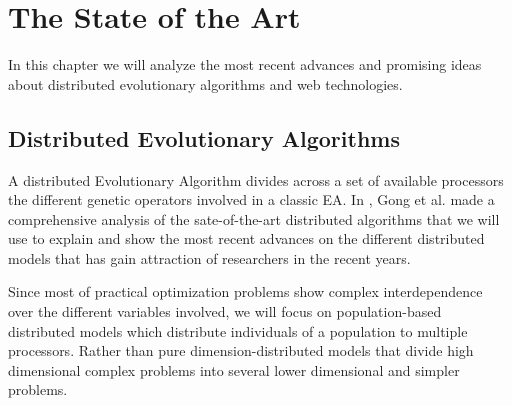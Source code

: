 \chapter{The State of the Art}
In this chapter we will analyze the most recent advances and promising ideas about distributed evolutionary algorithms and web technologies.

\section{Distributed Evolutionary Algorithms}
A distributed Evolutionary Algorithm divides across a set of available processors the different genetic operators involved in a classic EA. In \cite{soa-dea}, Gong et al. made a comprehensive analysis of the sate-of-the-art distributed algorithms that we will use to explain and show the most recent advances on the different distributed models that has gain attraction of researchers in the recent years.

Since most of practical optimization problems show complex interdependence over the different variables involved, we will focus on population-based distributed models which distribute individuals of a population to multiple processors. Rather than pure dimension-distributed models that divide high dimensional complex problems into several lower dimensional and simpler problems.

